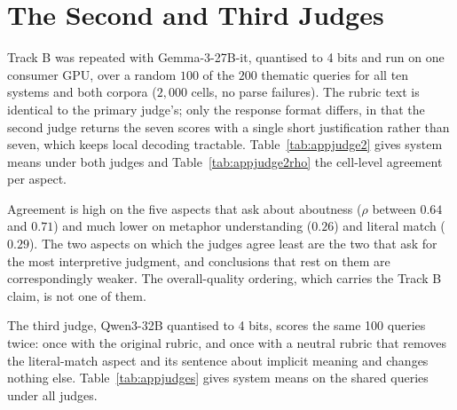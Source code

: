 \documentclass[11pt]{article}
\begin{document}
\section{The Second and Third Judges}
\label{app:judge2}
Track B was repeated with Gemma-3-27B-it, quantised to 4 bits and run on one consumer GPU, over a random $100$ of the $200$ thematic queries for all ten systems and both corpora ($2{,}000$ cells, no parse failures). The rubric text is identical to the primary judge's; only the response format differs, in that the second judge returns the seven scores with a single short justification rather than seven, which keeps local decoding tractable. Table~\ref{tab:appjudge2} gives system means under both judges and Table~\ref{tab:appjudge2rho} the cell-level agreement per aspect.

Agreement is high on the five aspects that ask about aboutness ($\rho$ between $0.64$ and $0.71$) and much lower on metaphor understanding ($0.26$) and literal match ($0.29$). The two aspects on which the judges agree least are the two that ask for the most interpretive judgment, and conclusions that rest on them are correspondingly weaker. The overall-quality ordering, which carries the Track B claim, is not one of them.

The third judge, Qwen3-32B quantised to 4 bits, scores the same 100 queries twice: once with the original rubric, and once with a neutral rubric that removes the literal-match aspect and its sentence about implicit meaning and changes nothing else. Table~\ref{tab:appjudges} gives system means on the shared queries under all judges.

\begin{table}[t]
\centering\small
\setlength{\tabcolsep}{4pt}

\caption{Track B overall quality on the 100 thematic queries scored by every judge, verse mode: Gemini 3.5 Flash (Gem.), Gemma-3-27B-it (Gem-3), and Qwen3-32B under the original (Q-orig) and neutral (Q-neut) rubrics. The last row gives Kendall $\tau$ of each system ordering with Gemini's.}
\label{tab:appjudges}
\end{table}

\begin{table}[!t]
\centering\small

\caption{Track B by judge aspect, verse mode, $n{=}200$ queries per cell. All aspects are scored from 1 to 5 with 5 highest; on \textit{lit.\ match} a high score means the results repeat the query's wording, which the rubric treats as evidence against implicit understanding. Lexical overlap can coexist with genuine relevance, and no claim in the paper rests on this aspect: the ordering from the aboutness aspects alone matches the overall one.}
\label{tab:appaspects}
\end{table}
\end{document}
